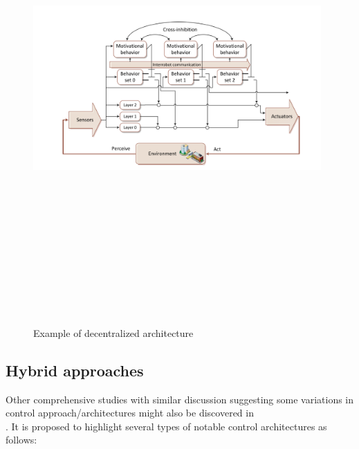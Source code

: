 \begin{figure}[!h]
        \centering 
        \includegraphics[width=11cm,height=18cm,keepaspectratio]{chapters/Chapitre_3/Figures/Decentralized}
        \caption{Example of decentralized architecture \cite{ventura2015safe}\cite{parker1998alliance}}
        \label{fig:DecentralizedArchitecture}
        \end{figure}


\newpage


\subsection{Hybrid approaches}
Other comprehensive studies with similar discussion suggesting some variations in control approach/architectures might also be discovered in \cite{chen2017towards}\cite{evestedt2016interaction}\cite{jiang2017eco}\cite{pendleton2017perception}\cite{yurtsever2020survey}\\ \cite{loke2019cooperative}\cite{zhou2016impact}. It is proposed to highlight several types of notable control architectures as follows: 

